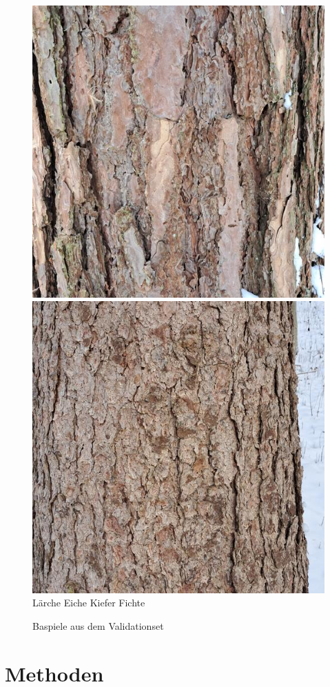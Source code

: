 \documentclass{article}
\begin{document}
\begin{figure}[h!]
  \includegraphics[width=0.24\linewidth]{examples/validation/Pine}
  \includegraphics[width=0.24\linewidth]{examples/validation/Spruce}
  Lärche \hspace{70pt} Eiche \hspace{70pt} Kiefer \hspace{70pt} Fichte\\
  \caption{Baspiele aus dem Validationset}
  \label{validation}
\end{figure}

\section{Methoden}
\end{document}
